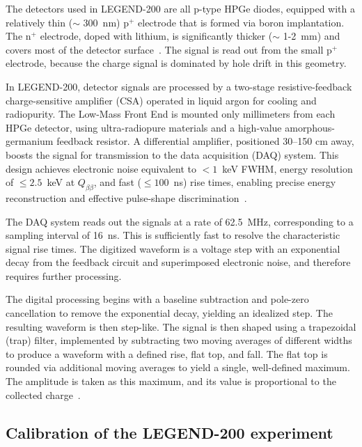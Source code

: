 The detectors used in LEGEND-200 are all p-type HPGe diodes, equipped with a relatively thin ($\sim$ 300~nm) p$^+$ electrode that is formed via boron implantation. The n$^+$ electrode, doped with lithium, is significantly thicker ($\sim$ 1-2~mm) and covers most of the detector surface~\cite{agostini_pulse_2022}. The signal is read out from the small p$^+$ electrode, because the charge signal is dominated by hole drift in this geometry. 

In LEGEND-200, detector signals are processed by a two-stage resistive-feedback charge-sensitive amplifier (CSA) operated in liquid argon for cooling and radiopurity. 
The Low-Mass Front End is mounted only millimeters from each HPGe detector, using ultra-radiopure materials and a high-value amorphous-germanium feedback resistor. A differential amplifier, positioned 30–150 cm away, boosts the signal for transmission to the data acquisition (DAQ) system. This design achieves electronic noise equivalent to $< 1$~keV FWHM, energy resolution of $\leq 2.5$~keV at $Q_{\beta \beta}$, and fast ($\leq 100$~ns) rise times, enabling precise energy reconstruction and effective pulse-shape discrimination~\cite{Willers_2020}.

The DAQ system reads out the signals at a rate of 62.5~MHz, corresponding to a sampling interval of 16~ns. This is sufficiently fast to resolve the characteristic signal rise times. The digitized waveform is a voltage step with an exponential decay from the feedback circuit and superimposed electronic noise, and therefore requires further processing.

The digital processing begins with a baseline subtraction and pole-zero cancellation to remove the exponential decay, yielding an idealized step. The resulting waveform is then step-like. The signal is then shaped using a trapezoidal (trap) filter, implemented by subtracting two moving averages of different widths to produce a waveform with a defined rise, flat top, and fall. The flat top is rounded via additional moving averages to yield a single, well-defined maximum. The amplitude is taken as this maximum, and its value is proportional to the collected charge~\cite{Willers_2020, salathe_2016150}.  


\subsection{Calibration of the LEGEND-200 experiment}

